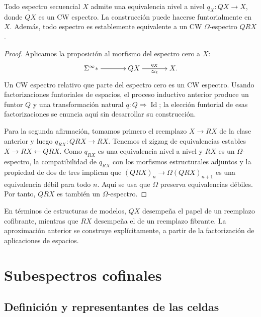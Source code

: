 \begin{coro}\label{coro:c11-aproximacion-cw}
Todo espectro secuencial $X$ admite una equivalencia nivel a nivel $q_X\colon QX\to X$, donde $QX$ es un CW espectro. La construcción puede hacerse funtorialmente en $X$. Además, todo espectro es establemente equivalente a un CW $\Omega$-espectro $QRX$.
\end{coro}
\begin{proof}
Aplicamos la proposición al morfismo del espectro cero a $X$:
\[
\begin{tikzcd}[cramped,column sep=large]
\Sigma^\infty * \arrow[r] & QX \arrow[r,"q_X","\simeq_\ell"'] & X.
\end{tikzcd}
\]
Un CW espectro relativo que parte del espectro cero es un CW espectro. Usando factorizaciones funtoriales de espacios, el proceso inductivo anterior produce un funtor $Q$ y una transformación natural $q\colon Q\Rightarrow\operatorname{Id}$; la elección funtorial de esas factorizaciones se enuncia aquí sin desarrollar su construcción.

Para la segunda afirmación, tomamos primero el reemplazo $X\to RX$ de la clase anterior y luego $q_{RX}\colon QRX\to RX$. Tenemos el zigzag de equivalencias estables $X\to RX\leftarrow QRX$. Como $q_{RX}$ es una equivalencia nivel a nivel y $RX$ es un $\Omega$-espectro, la compatibilidad de $q_{RX}$ con los morfismos estructurales adjuntos y la propiedad de dos de tres implican que $(QRX)_n\to\Omega(QRX)_{n+1}$ es una equivalencia débil para todo $n$. Aquí se usa que $\Omega$ preserva equivalencias débiles. Por tanto, $QRX$ es también un $\Omega$-espectro.
\end{proof}

En términos de estructuras de modelos, $QX$ desempeña el papel de un reemplazo cofibrante, mientras que $RX$ desempeña el de un reemplazo fibrante. La aproximación anterior se construye explícitamente, a partir de la factorización de aplicaciones de espacios.

\section{Subespectros cofinales}

\subsection{Definición y representantes de las celdas}

